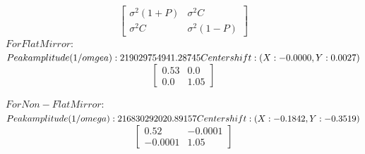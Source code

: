 \documentclass[twoside]{article}
\begin{document}


\begin{equation}
    \begin{bmatrix}
        \sigma^2(1+P) & \sigma^2 C \\
        \sigma^2 C & \sigma^2 (1-P)
    \end{bmatrix}
\end{equation}
$For Flat Mirror:$
$Peak amplitude (1/omgea): 219029754941.28745 \\
Center shift: (X: -0.0000, Y: 0.0027)$
\begin{equation}
    \begin{bmatrix}
        0.53 & 0.0 \\
        0.0 & 1.05
    \end{bmatrix}
\end{equation}

$For Non - Flat Mirror:$
$ Peak amplitude (1/omega): 216830292020.89157 \\
Center shift: (X: -0.1842, Y: -0.3519)$
\begin{equation}
    \begin{bmatrix}
        0.52 & -0.0001 \\
        -0.0001 & 1.05
    \end{bmatrix}
\end{equation}
\end{document}
